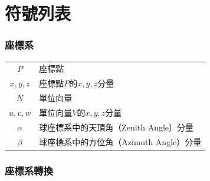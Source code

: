 \chapter*{符號列表}
\label{chp:symbol}




\subsection*{座標系}

\begin{longtable}[l]{cl}
    $P$ & 座標點\\
    $x,y,z$ & 座標點$P$的$x,y,z$分量\\
    $N$ & 單位向量\\
    $u,v,w$ & 單位向量$V$的$x,y,z$分量\\
    $\alpha$ & 球座標系中的天頂角（Zenith Angle）分量\\
    $\beta$ & 球座標系中的方位角（Azimuth Angle）分量\\
\end{longtable}





\onehalfspacing

\subsection*{座標系轉換}

